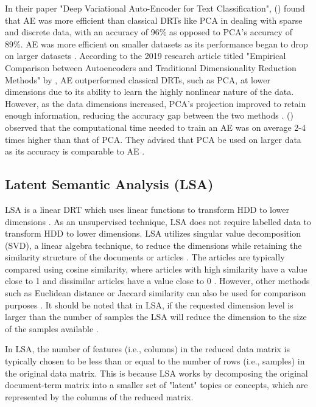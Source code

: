 \documentclass[12pt]{article}
\begin{document}
In their paper "Deep Variational Auto-Encoder for Text Classification", \citeauthor{8780129} (\citeyear{8780129}) found that AE was more efficient than classical DRTs like PCA in dealing with sparse and discrete data, with an accuracy of 96\% as opposed to PCA's accuracy of 89\%. AE was more efficient on smaller datasets as its performance began to drop on larger datasets \parencite{8780129}. According to the 2019 research article titled "Empirical Comparison between Autoencoders and Traditional Dimensionality Reduction Methods" by \citeauthor{8791727}, AE outperformed classical DRTs, such as PCA, at lower dimensions due to its ability to learn the highly nonlinear nature of the data. However, as the data dimensions increased, PCA's projection improved to retain enough information, reducing the accuracy gap between the two methods \parencite{8791727}. \citeauthor{8791727} (\citeyear{8791727}) observed that the computational time needed to train an AE was on average 2-4 times higher than that of PCA. They advised that PCA be used on larger data as its accuracy is comparable to AE \parencite{8791727}.

\subsection{Latent Semantic Analysis (LSA)}
\hspace{\parindent} LSA is a linear DRT which uses linear functions to transform HDD to lower dimensions \parencite{ayesha_hanif_talib_2020}. As an unsupervised technique, LSA does not require labelled data to transform HDD to lower dimensions. LSA utilizes singular value decomposition (SVD), a linear algebra technique, to reduce the dimensions while retaining the similarity structure of the documents or articles \parencite{dumais_2005}. The articles are typically compared using cosine similarity, where articles with high similarity have a value close to 1 and dissimilar articles have a value close to 0 \parencite{dumais_2005}. However, other methods such as Euclidean distance or Jaccard similarity can also be used for comparison purposes \parencite{dumais_2005}. It should be noted that in LSA, if the requested dimension level is larger than the number of samples the LSA will reduce the dimension to the size of the samples available \parencite{dumais_2005}.

In LSA, the number of features (i.e., columns) in the reduced data matrix is typically chosen to be less than or equal to the number of rows (i.e., samples) in the original data matrix. This is because LSA works by decomposing the original document-term matrix into a smaller set of "latent" topics or concepts, which are represented by the columns of the reduced matrix.
\end{document}
